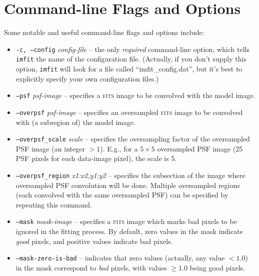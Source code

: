 \documentclass[10pt,a4paper,article]{memoir}
\newcommand{\imfitprog}{\texttt{imfit}}
\begin{document}
\section{Command-line Flags and Options}\label{sec:imfit-flags}

Some notable and useful command-line flags and options include:
\begin{itemize}
\item \texttt{-c, --config} \textit{config-file} -- the only \textit{required}
command-line option, which tells \imfitprog{} the name of the configuration file.
(Actually, if you don't supply this option, \imfitprog{} will look for a file
called ``imfit\_config.dat'', but it's best to explicitly specify your own
configuration files.)

\bigskip

\item \texttt{--psf} \textit{psf-image} -- specifies a \textsc{fits} image to be convolved
with the model image.

\bigskip

\item \texttt{--overpsf} \textit{psf-image} -- specifies an oversampled
\textsc{fits} image to be convolved with (a subregion of) the model image.

\item \texttt{--overpsf\_scale} \textit{scale} -- specifies the oversampling
factor of the oversampled PSF image (an integer $> 1$). E.g., for a $5 \times 5$
oversampled PSF image (25 PSF pixels for each data-image pixel), the scale is 5.

\item \texttt{--overpsf\_region} \textit{x1:x2,y1:y2} -- specifies the
subsection of the image where oversampled PSF convolution will be done.
Multiple oversampled regions (each convolved with the same oversampled
PSF) can be specified by repeating this command.

\bigskip

\item \texttt{--mask} \textit{mask-image} -- specifies a \textsc{fits} image which marks
bad pixels to be ignored in the fitting process. By default, zero values in
the mask indicate \textit{good} pixels, and positive values indicate bad pixels.
\item \texttt{--mask-zero-is-bad} -- indicates that zero values (actually,
any value $< 1.0$) in the mask correspond to \textit{bad} pixels, with values
$\geq 1.0$ being good pixels.

\bigskip


\end{itemize}
\end{document}
